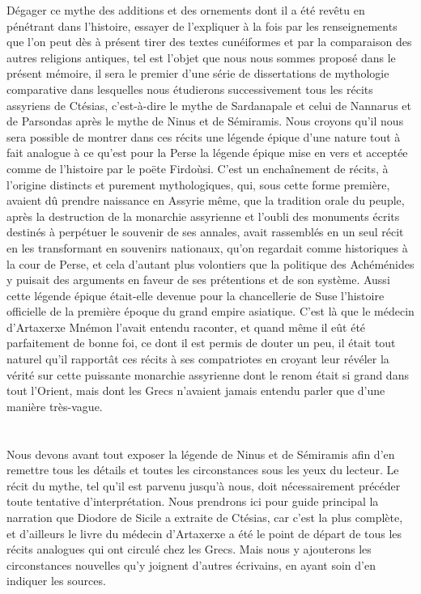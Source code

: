 \documentclass[a4paper, 11pt, oneside]{article}
\begin{document}
Dégager ce mythe des additions et des ornements dont il a été revêtu en pénétrant dans l'histoire, essayer de l'expliquer à la fois par les renseignements que l'on peut dès à présent tirer des textes cunéiformes et par la comparaison des autres religions antiques, tel est l'objet que nous nous sommes proposé dans le présent mémoire, il sera le premier d'une série de dissertations de mythologie comparative dans lesquelles nous étudierons successivement tous les récits assyriens de Ctésias, c'est-à-dire le mythe de Sardanapale et celui de Nannarus et de Parsondas après le mythe de Ninus et de Sémiramis. Nous croyons qu'il nous sera possible de montrer dans ces récits une légende épique d'une nature tout à fait analogue à ce qu'est pour la Perse la légende épique mise en vers et acceptée comme de l'histoire par le poëte Firdoùsi. C'est un enchaînement de récits, à l'origine distincts et purement mythologiques, qui, sous cette forme première, avaient dû prendre naissance en Assyrie même, que la tradition orale du peuple, après la destruction de la monarchie assyrienne et l'oubli des monuments écrits destinés à perpétuer le souvenir de ses annales, avait rassemblés en un seul récit en les transformant en souvenirs nationaux, qu'on regardait comme historiques à la cour de Perse, et cela d'autant plus volontiers que la politique des Achéménides y puisait des arguments en faveur de ses prétentions et de son système. Aussi cette légende épique était-elle devenue pour la chancellerie de Suse l'histoire officielle de la première époque du grand empire asiatique. C'est là que le médecin d'Artaxerxe Mnémon l'avait entendu raconter, et quand même il eût été parfaitement de bonne foi, ce dont il est permis de douter un peu, il était tout naturel qu'il rapportât ces récits à ses compatriotes en croyant leur révéler la vérité sur cette puissante monarchie assyrienne dont le renom était si grand dans tout l'Orient, mais dont les Grecs n'avaient jamais entendu parler que d'une manière très-vague.

\bigskip \centerline{\EightStarTaper} \centerline{\EightStarTaper\EightStarTaper} \bigskip\clearpage
\section{}
\paragraph{}
Nous devons avant tout exposer la légende de Ninus et de Sémiramis afin d'en remettre tous les détails et toutes les circonstances sous les yeux du lecteur. Le récit du mythe, tel qu'il est parvenu jusqu'à nous, doit nécessairement précéder toute tentative d'interprétation. Nous prendrons ici pour guide principal la narration que Diodore de Sicile a extraite de Ctésias, car c'est la plus complète, et d'ailleurs le livre du médecin d'Artaxerxe a été le point de départ de tous les récits analogues qui ont circulé chez les Grecs. Mais nous y ajouterons les circonstances nouvelles qu'y joignent d'autres écrivains, en ayant soin d'en indiquer les sources.
\end{document}
